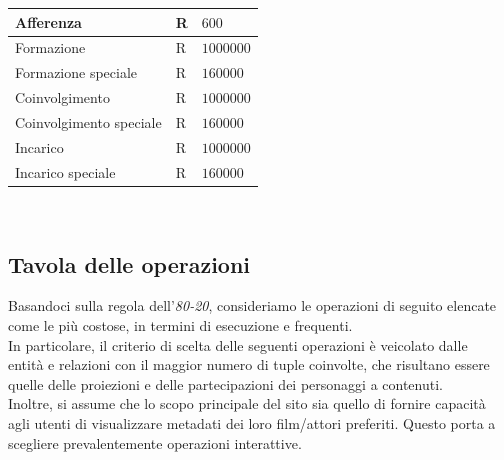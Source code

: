 \documentclass[a4paper]{article}
\begin{document}
\begin{tabular}{ | L{0.33\textwidth} | L{0.33\textwidth} | L{0.33\textwidth} | }
\hline
 Afferenza & R & $600$ \\ 

 \hline
 Formazione & R & $1000000$ \\ 

\hline
Formazione speciale & R & $160000$ \\ 

\hline
 Coinvolgimento & R & $1000000$ \\ 

\hline
Coinvolgimento speciale & R & $160000$ \\ 

\hline
 Incarico & R & $1000000$ \\ 

\hline
Incarico speciale & R & $160000$ \\ 

\hline
\end{tabular}
\\

\subsection{Tavola delle operazioni}
Basandoci sulla regola dell'\emph{80-20}, consideriamo le operazioni di seguito 
elencate come le più costose, in termini di esecuzione e frequenti. \\
In particolare, il criterio di scelta delle seguenti operazioni è veicolato dalle \\
entità e relazioni con il maggior numero di tuple coinvolte, che 
risultano essere quelle delle proiezioni e delle partecipazioni dei personaggi a contenuti. \\
Inoltre, si assume che lo scopo principale del sito sia quello di fornire capacità agli utenti
di visualizzare metadati dei loro film/attori preferiti. Questo porta a scegliere prevalentemente
operazioni interattive. \\

\hfill \break
\end{document}
